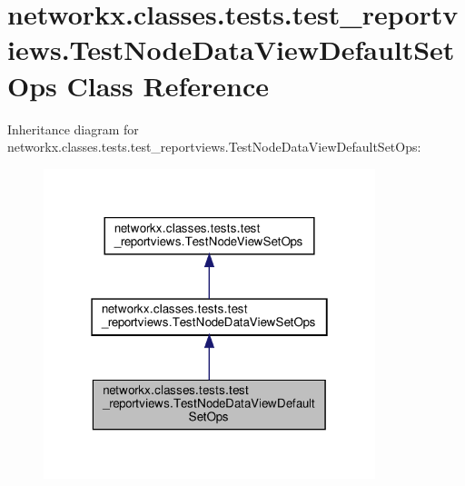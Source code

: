 \hypertarget{classnetworkx_1_1classes_1_1tests_1_1test__reportviews_1_1TestNodeDataViewDefaultSetOps}{}\section{networkx.\+classes.\+tests.\+test\+\_\+reportviews.\+Test\+Node\+Data\+View\+Default\+Set\+Ops Class Reference}
\label{classnetworkx_1_1classes_1_1tests_1_1test__reportviews_1_1TestNodeDataViewDefaultSetOps}


Inheritance diagram for networkx.\+classes.\+tests.\+test\+\_\+reportviews.\+Test\+Node\+Data\+View\+Default\+Set\+Ops\+:
\nopagebreak
\begin{figure}[H]
\begin{center}
\leavevmode
\includegraphics[width=274pt]{classnetworkx_1_1classes_1_1tests_1_1test__reportviews_1_1TestNodeDataViewDefaultSetOps__inherit__graph}
\end{center}
\end{figure}


